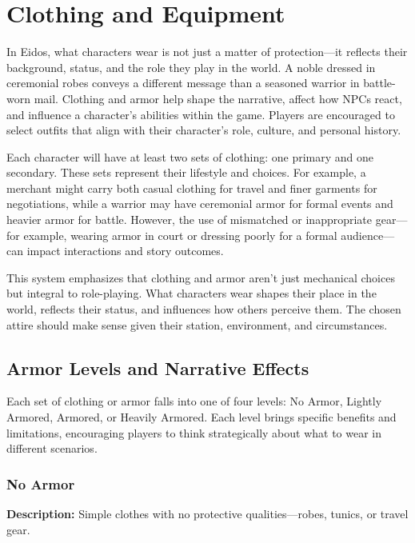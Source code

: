 \documentclass[12pt]{book}  %
\begin{document}
\chapter{Clothing and Equipment}

In Eidos, what characters wear is not just a matter of protection—it reflects their background, status, and the role they play in the world. A noble dressed in ceremonial robes conveys a different message than a seasoned warrior in battle-worn mail. Clothing and armor help shape the narrative, affect how NPCs react, and influence a character’s abilities within the game. Players are encouraged to select outfits that align with their character’s role, culture, and personal history.

Each character will have at least two sets of clothing: one primary and one secondary. These sets represent their lifestyle and choices. For example, a merchant might carry both casual clothing for travel and finer garments for negotiations, while a warrior may have ceremonial armor for formal events and heavier armor for battle. However, the use of mismatched or inappropriate gear—for example, wearing armor in court or dressing poorly for a formal audience—can impact interactions and story outcomes.

This system emphasizes that clothing and armor aren’t just mechanical choices but integral to role-playing. What characters wear shapes their place in the world, reflects their status, and influences how others perceive them. The chosen attire should make sense given their station, environment, and circumstances.

\section{Armor Levels and Narrative Effects}

Each set of clothing or armor falls into one of four levels: No Armor, Lightly Armored, Armored, or Heavily Armored. Each level brings specific benefits and limitations, encouraging players to think strategically about what to wear in different scenarios.

\subsection*{No Armor}

\textbf{Description:} Simple clothes with no protective qualities—robes, tunics, or travel gear.
\end{document}
